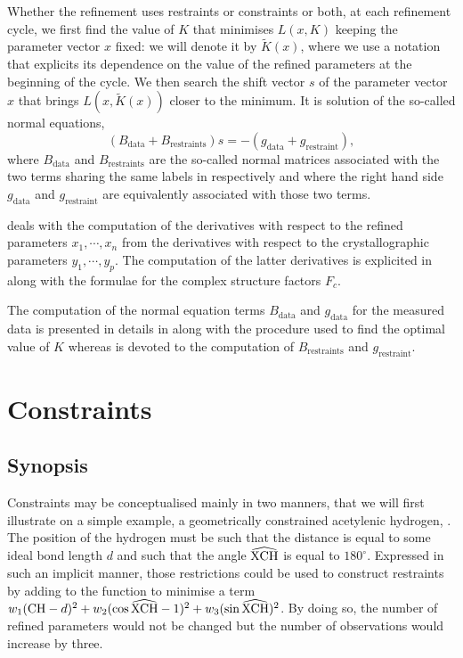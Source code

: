 \documentclass[pdf]{iucr}
\begin{document}
Whether the refinement uses restraints or constraints or both, at each refinement cycle, we first find the value of $K$ that minimises $L(x, K)$ keeping the parameter vector $x$ fixed: we will denote it by $\tilde{K}(x)$, where we use a notation that explicits its dependence on the value of the refined parameters at the beginning of the cycle. We then search the shift vector $s$ of the parameter vector $x$ that brings $L(x, \tilde{K}(x))$ closer to the minimum. It is solution of the so-called normal equations,
\begin{equation}
(B_\text{data} + B_\text{restraints})s = -(g_\text{data} + g_\text{restraint}),
\label{eqn:generalnormalequations}
\end{equation}
where $B_\text{data}$ and $B_\text{restraints}$ are the so-called normal matrices associated with the two terms sharing the same labels in  respectively and where the right hand side $g_\text{data}$ and $g_\text{restraint}$ are equivalently associated with those two terms.

 deals with the computation of the derivatives with respect to the refined parameters $x_1, \cdots, x_n$ from the derivatives with respect to the crystallographic parameters $y_1, \cdots, y_p$. The computation of the latter derivatives is explicited in  along with the formulae for the complex structure factors $F_c$.

The computation of the normal equation terms $B_\text{data}$ and $g_\text{data}$ for the measured data is presented in details in  along with the procedure used to find the optimal value of $K$ whereas  is devoted to the computation of $B_\text{restraints}$ and $g_\text{restraint}$.

\section{Constraints}
\label{sec:constraints}

\subsection{Synopsis}

Constraints may be conceptualised mainly in two manners, that we will first illustrate on a simple example, a geometrically constrained acetylenic hydrogen, . The position of the hydrogen must be such that the distance  is equal to some ideal bond length $d$ and such that the angle $\widehat{\ce{XCH}}$ is equal to $180^\circ$. Expressed in such an implicit manner, those restrictions could be used to construct restraints by adding to the function to minimise a term $w_1 (\ce{CH} - d)^2 + w_2 (\cos \widehat{\ce{XCH}} - 1)^2 + w_3 (\sin  \widehat{\ce{XCH}})^2$. By doing so, the number of refined parameters would not be changed but the number of observations would increase by three. 
\end{document}
